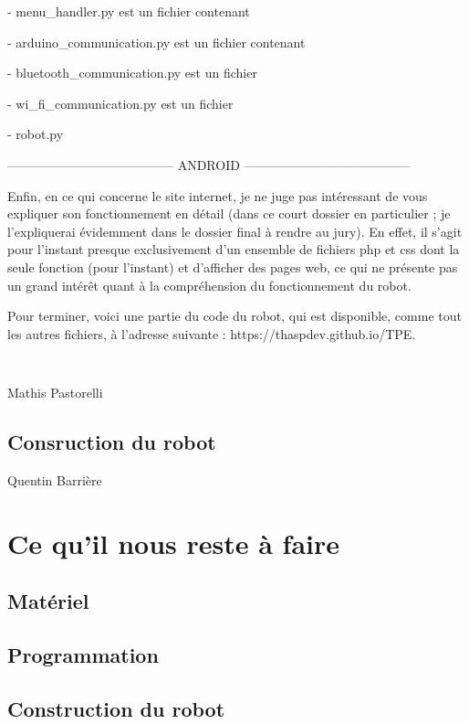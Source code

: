 \documentclass[12pt,a4paper]{article}
\begin{document}
	- menu\_handler.py est un fichier contenant
	
	- arduino\_communication.py est un fichier contenant
	
	- bluetooth\_communication.py est un fichier
	
	- wi\_fi\_communication.py est un fichier
	
	- robot.py

---------------------------------------	
	ANDROID
---------------------------------------

	Enfin, en ce qui concerne le site internet, je ne juge pas intéressant de vous expliquer son fonctionnement en détail (dans ce court dossier en particulier ; je l'expliquerai évidemment dans le dossier final à rendre au jury). En effet, il s'agit pour l'instant presque exclusivement d'un ensemble de fichiers php et css dont la seule fonction (pour l'instant) et d'afficher des pages web, ce qui ne présente pas un grand intérêt quant à la compréhension du fonctionnement du robot.
	
	Pour terminer, voici une partie du code du robot, qui est disponible, comme tout les autres fichiers, à l'adresse suivante : https://thaspdev.github.io/TPE.
	
	
	\begin{lstlisting}


	\end{lstlisting}
	
	\nopagebreak\hfill Mathis Pastorelli

	\subsection{Consruction du robot}
	
	\nopagebreak
	\hfill Quentin Barri\`ere
	
	\section{Ce qu'il nous reste \`a faire}
	
	\subsection{Mat\'eriel}
	
	\subsection{Programmation}
	
	\subsection{Construction du robot}	
	
	
\end{document}
